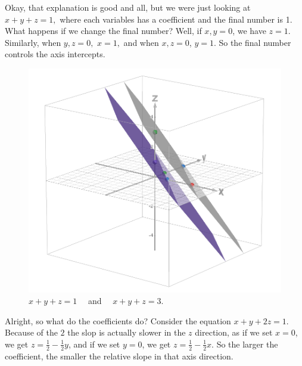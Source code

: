 \documentclass[12pt]{scrartcl}
\begin{document}
Okay, that explanation is good and all, but we were just looking at $x + y + z = 1,$ where each variables has a coefficient and the final number is 1. What happens if we change the final number? Well, if $x,y=0$, we have $z=1$. Similarly, when $y,z=0,$ $x=1,$ and when $x,z=0$, $y=1.$ So the final number controls the axis intercepts.
\begin{figure}[H]
    \centering
    \includegraphics[scale=0.6]{Intercepts of Linear Equations.png}
    \caption*{$x+y+z=1\quad$ and $\quad x+y+z=3.$}
\end{figure}
Alright, so what do the coefficients do? Consider the equation $x+y+2z = 1.$ Because of the $2$ the slop is actually slower in the $z$ direction, as if we set $x=0$, we get $z = \frac{1}{2} - \frac{1}{2}y$, and if we set $y=0$, we get $z = \frac{1}{2} - \frac{1}{2}x.$ So the larger the coefficient, the smaller the relative slope in that axis direction.
\end{document}
